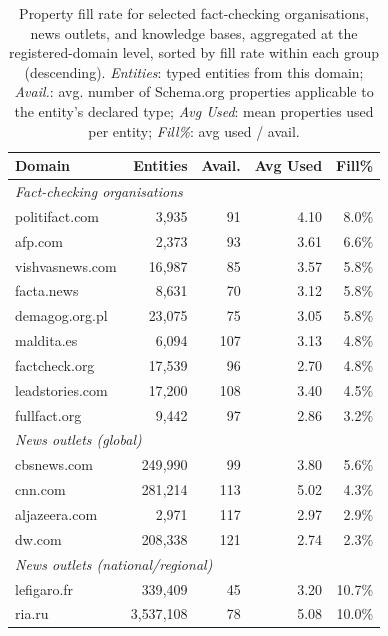 \documentclass[11pt,a4paper]{article}
\begin{document}
\begin{table}[H]
\centering
\small
\setlength{\tabcolsep}{4pt}
\caption{Property fill rate for selected fact-checking organisations, news outlets,
  and knowledge bases, aggregated at the registered-domain level,
  sorted by fill rate within each group (descending).
  \textit{Entities}: typed entities from this domain;
  \textit{Avail.}: avg. number of Schema.org properties applicable to the entity's declared type;
  \textit{Avg Used}: mean properties used per entity;
  \textit{Fill\%}: avg used / avail.}
\label{tab:fillrate}
\begin{tabular}{lrrrr}
\toprule
\textbf{Domain} & \textbf{Entities} & \textbf{Avail.} & \textbf{Avg Used} & \textbf{Fill\%} \\
\midrule
\multicolumn{5}{l}{\textit{Fact-checking organisations}} \\
\midrule
politifact.com        &   3{,}935  &  91 & 4.10 &  8.0\% \\
afp.com               &   2{,}373  &  93 & 3.61 &  6.6\% \\
vishvasnews.com       &  16{,}987  &  85 & 3.57 &  5.8\% \\
facta.news            &   8{,}631  &  70 & 3.12 &  5.8\% \\
demagog.org.pl        &  23{,}075  &  75 & 3.05 &  5.8\% \\
maldita.es            &   6{,}094  & 107 & 3.13 &  4.8\% \\
factcheck.org         &  17{,}539  &  96 & 2.70 &  4.8\% \\
leadstories.com       &  17{,}200  & 108 & 3.40 &  4.5\% \\
fullfact.org          &   9{,}442  &  97 & 2.86 &  3.2\% \\
\midrule
\multicolumn{5}{l}{\textit{News outlets (global)}} \\
\midrule
cbsnews.com           &  249{,}990  &  99 & 3.80 &  5.6\% \\
cnn.com               &  281{,}214  & 113 & 5.02 &  4.3\% \\
aljazeera.com         &    2{,}971  & 117 & 2.97 &  2.9\% \\
dw.com                &  208{,}338  & 121 & 2.74 &  2.3\% \\
\midrule
\multicolumn{5}{l}{\textit{News outlets (national/regional)}} \\
\midrule
lefigaro.fr           &   339{,}409   &  45 & 3.20 & 10.7\% \\
ria.ru                & 3{,}537{,}108 &  78 & 5.08 & 10.0\% \\

\end{tabular}
\end{table}
\end{document}
